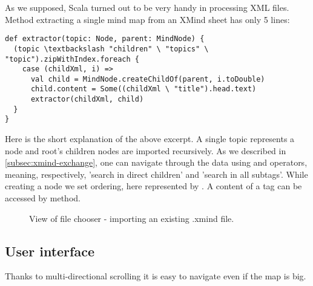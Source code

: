 As we supposed, Scala turned out to be very handy in processing XML files. Method extracting a single mind map from an XMind sheet has only 5 lines: 
\begin{verbatim}
def extractor(topic: Node, parent: MindNode) {
  (topic \textbackslash "children" \ "topics" \ "topic").zipWithIndex.foreach {
    case (childXml, i) =>
      val child = MindNode.createChildOf(parent, i.toDouble)
      child.content = Some((childXml \ "title").head.text)
      extractor(childXml, child)
  }
}\end{verbatim}

Here is the short explanation of the above excerpt. A single topic represents a node and root's children nodes are imported recursively. As we described in \cref{subsec:xmind-exchange}, one can navigate through the data using \inlinecode{\textbackslash} and \inlinecode{\textbackslash\textbackslash} operators, meaning, respectively, 'search in direct children' and 'search in all subtags'. While creating a node we set ordering, here represented by .  A content of a tag can be accessed by  method. 

\begin{figure}[h]
	\centering
	\caption{View of file chooser - importing an existing .xmind file.}
	\label{fig:screen-filechooser}
\end{figure}


\subsection{User interface}
\label{subsec:ui}
Thanks to multi-directional scrolling it is easy to navigate even if the map is big.

